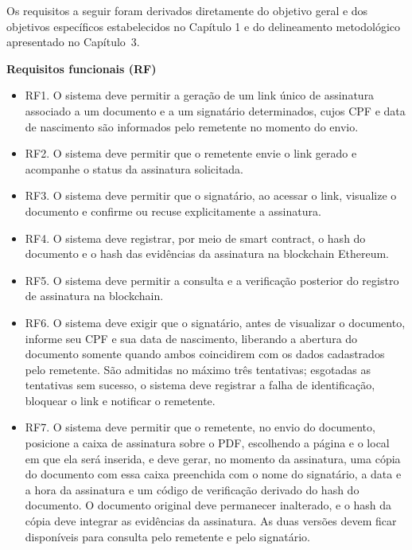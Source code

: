 \documentclass[
    12pt,
    a4paper,
    oneside,
    chapter=TITLE,
    section=TITLE,
    subsection=TITLE,
    subsubsection=TITLE,
    sumario=tradicional,
    english,
    brazil
]{abntex2}
\begin{document}
Os requisitos a seguir foram derivados diretamente do objetivo geral
e dos objetivos específicos estabelecidos no Capítulo 1 e do
delineamento metodológico apresentado no Capítulo~3.

\textbf{Requisitos funcionais (RF)}

\begin{itemize}
    \item RF1. O sistema deve permitir a geração de um link único
    de assinatura associado a um documento e a um signatário
    determinados, cujos CPF e data de nascimento são informados pelo
    remetente no momento do envio.

    \item RF2. O sistema deve permitir que o remetente envie o
    link gerado e acompanhe o status da assinatura solicitada.

    \item RF3. O sistema deve permitir que o signatário, ao
    acessar o link, visualize o documento e confirme ou recuse
    explicitamente a assinatura.

    \item RF4. O sistema deve registrar, por meio de smart
    contract, o hash do documento e o hash das evidências da
    assinatura na blockchain Ethereum.

    \item RF5. O sistema deve permitir a consulta e a verificação
    posterior do registro de assinatura na blockchain.

    \item RF6. O sistema deve exigir que o signatário, antes de
    visualizar o documento, informe seu CPF e sua data de nascimento,
    liberando a abertura do documento somente quando ambos coincidirem
    com os dados cadastrados pelo remetente. São admitidas no máximo
    três tentativas; esgotadas as tentativas sem sucesso, o sistema
    deve registrar a falha de identificação, bloquear o link e
    notificar o remetente.

    \item RF7. O sistema deve permitir que o remetente, no envio do
    documento, posicione a caixa de assinatura sobre o PDF, escolhendo
    a página e o local em que ela será inserida, e deve gerar, no
    momento da assinatura, uma cópia do documento com essa caixa
    preenchida com o nome do signatário, a data e a hora da assinatura
    e um código de verificação derivado do hash do documento. O
    documento original deve permanecer inalterado, e o hash da cópia
    deve integrar as evidências da assinatura. As duas versões devem
    ficar disponíveis para consulta pelo remetente e pelo signatário.
\end{itemize}
\end{document}
